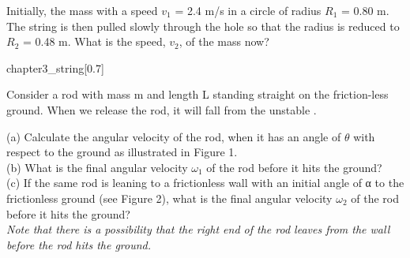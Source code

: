 \begin{example}
	Initially, the mass  with a speed $v_1$ = 2.4 m/s in
	a circle of radius $R_1$ = 0.80 m.
	The string is then pulled slowly through the hole so
	that the radius is reduced to $R_2$ = 0.48 m. What is the
	speed, $v_2$, of the mass now?
	\begin{singlefigure}{chapter3_string}[0.7]
	\end{singlefigure}
\end{example}
\begin{example}
	Consider a rod with mass m and length L standing straight on the friction-less ground. When we
	release the rod, it will fall from the unstable .
	\begin{center}
		\quad
	\end{center}
	(a) Calculate the angular velocity of the rod, when it has an angle of $\theta$ with respect to the ground
	as illustrated in Figure 1.\\
	(b) What is the final angular velocity $\omega_1$ of the rod before it hits the ground?\\
	(c) If the same rod is leaning to a frictionless wall with an initial angle of α to the frictionless
	ground (see Figure 2), what is the final angular velocity $\omega_2$ of the rod before it hits the ground?\\
	{\em Note that there is a possibility that the right end of the rod leaves from the wall before the rod hits the ground.}
\end{example}